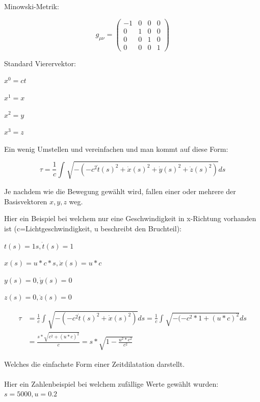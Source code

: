 \begin{refsection}
Minowski-Metrik:

\begin{equation}
    g_{\mu\nu}=
    \begin{pmatrix}
        -1 & 0 & 0 & 0 \\
        0 & 1 & 0 & 0 \\
        0 & 0 & 1 & 0 \\
        0 & 0 & 0 & 1
    \end{pmatrix}
\end{equation}

Standard Vierervektor:

\begin{list}{}{}
    \item \(x^{0}=ct\)
    \item \(x^{1}=x\)
    \item \(x^{2}=y\)
    \item \(x^{3}=z\)
\end{list}

Ein wenig Umstellen und vereinfachen und man kommt auf diese Form:

\begin{equation}
    \tau
    =
    \frac{1}{c}\int_{}^{}\sqrt{-(-c^2\dot{t}(s)^{2}+\dot{x}(s)^{2}+\dot{y}(s)^{2}+\dot{z}(s)^{2})}ds
\end{equation}

Je nachdem wie die Bewegung gew\"ahlt wird, fallen einer oder mehrere der Basisvektoren  $x, y, z$ weg.

Hier ein Beispiel bei welchem nur eine Geschwindigkeit in x-Richtung vorhanden ist (c=Lichtgeschwindigkeit, u beschreibt den Bruchteil):

\begin{list}{}{}
    \item $t(s)=1s, \dot{t}(s)=1$
    \item $x(s)=u*c*s, \dot{x}(s)=u*c$
    \item $y(s)=0, \dot{y}(s)=0$
    \item $z(s)=0, \dot{z}(s)=0$
\end{list}

\begin{align*}
    \tau
    &=
    \frac{1}{c}\int_{}^{}\sqrt{-(-c^2\dot{t}(s)^2+\dot{x}(s)^2)}ds 
    =
    \frac{1}{c}\int_{}^{}\sqrt{-(-c^2*1+(u*c)^{2}}ds\\
    &=
    \frac{s*\sqrt{c^2+(u*c)^{2}}}{c} 
    =
    s*\sqrt{1-\frac{u^2*c^2}{c^2}}
\end{align*}

Welches die einfachste Form einer Zeitdilatation darstellt.\\
\\
Hier ein Zahlenbeispiel bei welchem zuf\"allige Werte gew\"ahlt wurden:
$s=5000, u=0.2$ 


\end{refsection}
